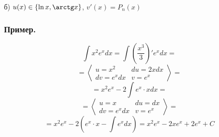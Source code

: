 б) $u(x) \in \{\ln x, \arctg x \}$, $v'(x)=P_n(x)$

\subsubsection{Пример.}

$$\int x^2 e^x dx = \int \left(\frac{x^3}{3}\right)'e^x dx=$$ $$=
\left<\begin{array}{c|c}
u=x^2 & du=2xdx \\
dv=e^x dx & v=e^x
\end{array}\right>=$$ $$=
x^2 e^x - 2\int e^x \cdot x dx=$$ $$=
\left<\begin{array}{c|c}
u=x & du=dx \\
dv=e^x dx & v=e^x
\end{array}\right>=$$ $$=
x^2 e^x-2\left(e^x \cdot x - \int e^x dx \right)=x^2 e^x - 2 x e^x + 2 e^x +C
$$



